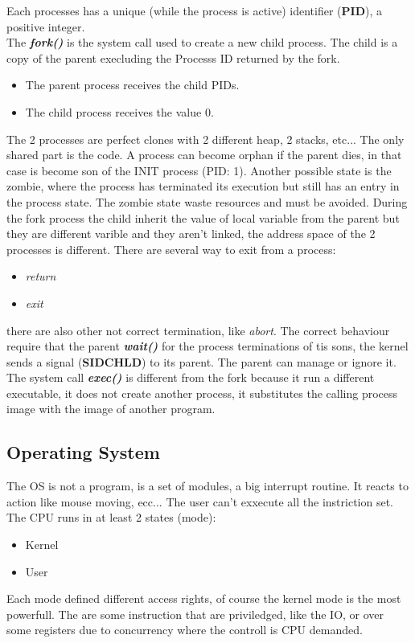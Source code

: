 \documentclass[12pt]{article}
\begin{document}
Each processes has a unique (while the process is active) identifier (\textbf{PID}), a positive integer.\\
The \textbf{\textit{fork()}} is the system call used to create a new child process. The child is a copy of the parent execluding the Processs ID returned by the fork.
\begin{itemize}
  \item The parent process receives the child PIDs.
  \item The child process receives the value 0.
\end{itemize}
The 2 processes are perfect clones with 2 different heap, 2 stacks, etc... The only shared part is the code. A process can become orphan if the parent dies, in that case is become son of the INIT process (PID: 1). Another possible state is the zombie, where the process has terminated its execution but still has an entry in the process state. The zombie state waste resources and must be avoided. During the fork process the child inherit the value of local variable from the parent but they are different varible and they aren't linked, the address space of the 2 processes is different.
There are several way to exit from a process:
\begin{itemize}
  \item \textit{return}
  \item \textit{exit}
\end{itemize}
there are also other not correct termination, like \textit{abort}. The correct behaviour require that the parent \textbf{\textit{wait()}} for the process terminations of tis sons, the kernel sends a signal (\textbf{SIDCHLD}) to its parent. The parent can manage or ignore it.\\
The system call \textbf{\textit{exec()}} is different from the fork because it run a different executable, it does not create another process, it substitutes the calling process image with the image of another program.

\subsection{Operating System}
The OS is not a program, is a set of modules, a big interrupt routine. It reacts to action like mouse moving, ecc... The user can't exxecute all the instriction set. The CPU runs in at least 2 states (mode):
\begin{itemize}
  \item Kernel
  \item User
\end{itemize}
Each mode defined different access rights, of course the kernel mode is the most powerfull. The are some instruction that are priviledged, like the I\/O, or over some registers due to concurrency where the controll is CPU demanded.\\
\end{document}
